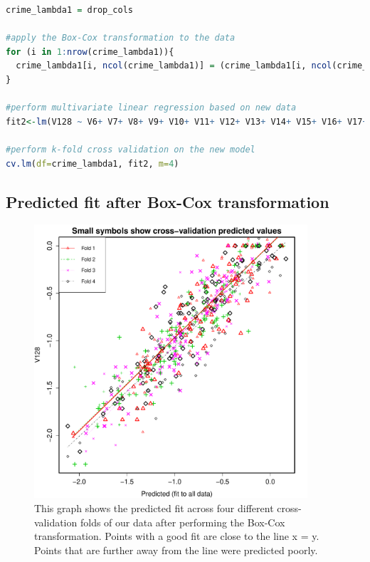 \documentclass{article}
\begin{document}
\begin{lstlisting}[language=r]
crime_lambda1 = drop_cols

#apply the Box-Cox transformation to the data
for (i in 1:nrow(crime_lambda1)){
  crime_lambda1[i, ncol(crime_lambda1)] = (crime_lambda1[i, ncol(crime_lambda1)]^0.3-1)/0.3
}

#perform multivariate linear regression based on new data
fit2<-lm(V128 ~ V6+ V7+ V8+ V9+ V10+ V11+ V12+ V13+ V14+ V15+ V16+ V17+ V18+ V19+ V20+ V21+ V22+ V23+ V24+ V25+ V26+ V27+ V28+ V29+ V30+ V32+ V33+ V34+ V35+ V36+ V37+ V38+ V39+ V40+ V41+ V42+ V43+ V44+ V45+ V46+ V47+ V48+ V49+ V50+ V51+ V52+ V53+ V54+ V55+ V56+ V57+ V58+ V59+ V60+ V61+ V62+ V63+ V64+ V65+ V66+ V67+ V68+ V69+ V70+ V71+ V72+ V73+ V74+ V75+ V76+ V77+ V78+ V79+ V80+ V81+ V82+ V83+ V84+ V85+ V86+ V87+ V88+ V89+ V90+ V91+ V92+ V93+ V94+ V95+ V96+ V97+ V98+ V99+ V100+ V101+ V119+ V120+ V121+ V126, data=crime_lambda1)

#perform k-fold cross validation on the new model
cv.lm(df=crime_lambda1, fit2, m=4)
\end{lstlisting}

\subsection{Predicted fit after Box-Cox transformation}
\begin{figure}[H]
\centering
\includegraphics[width=4in]{part1b.pdf}
\caption{This graph shows the predicted fit across four different cross-validation folds of our data after performing the Box-Cox transformation. Points with a good fit are close to the line x = y. Points that are further away from the line were predicted poorly.}\label{fig_container} 
\end{figure}
\end{document}
